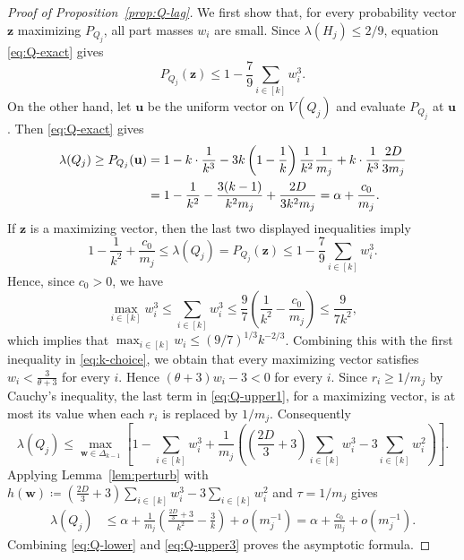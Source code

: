 \documentclass[10pt]{article}
\numberwithin{equation}{section}
\begin{document}
\begin{proof}[Proof of Proposition~\ref{prop:Q-lag}]
We first show that, for every probability vector $\mathbf{z}$ maximizing $P_{Q_j}$, all part masses $w_i$ are small. Since $\lambda(H_j)\le 2/9$, equation \eqref{eq:Q-exact} gives
\[
        P_{Q_j}(\mathbf{z})\le 1-\frac79\sum_{i\in[k]} w_i^3.
\]
On the other hand, let $\mathbf{u}$ be the uniform vector on $V(Q_j)$ and evaluate $P_{Q_j}$ at $\mathbf{u}$. 
Then \eqref{eq:Q-exact} gives
\begin{align}\label{eq:Q-lower}
    \lambda(Q_j)\ge P_{Q_j}(\mathbf{u})
        &=
        1-k\cdot\frac1{k^3}
        -3k\left(1-\frac1k\right)\frac1{k^2}\frac1{m_j}
        +k\cdot\frac1{k^3}\frac{2D}{3m_j} \notag \\
        &=1-\frac1{k^2}-\frac{3(k-1)}{k^2m_j}
        +\frac{2D}{3k^2m_j} 
        =\alpha+\frac{c_0}{m_j}.
\end{align}
If $\mathbf{z}$ is a maximizing vector, then the last two displayed inequalities imply
\[
        1-\frac1{k^2}+\frac{c_0}{m_j}
        \le \lambda(Q_j)=P_{Q_j}(\mathbf{z})
        \le 1-\frac79\sum_{i\in[k]} w_i^3 .
\]
Hence, since $c_0>0$, we have 
\[
        \max_{i\in[k]} w_i^3
        \le\sum_{i\in[k]} w_i^3
        \le \frac97\left(\frac1{k^2}-\frac{c_0}{m_j}\right)
        \le \frac{9}{7k^2}, 
\]
which implies that $\max_{i\in[k]} w_i \le \left(9/7\right)^{1/3}k^{-2/3}$. 
Combining this with the first inequality in \eqref{eq:k-choice}, we obtain that every maximizing vector satisfies $w_i<\frac3{\theta+3}$ for every $i$. Hence $(\theta+3)w_i-3<0$ for every $i$. Since $r_i\ge 1/m_j$ by Cauchy's inequality, the last term in \eqref{eq:Q-upper1}, for a maximizing vector, is at most its value when each $r_i$ is replaced by $1/m_j$. Consequently
\begin{equation}
        \lambda(Q_j)\le \max_{\mathbf{w} \in \Delta_{k-1}} \left[ 1-\sum_{i\in[k]} w_i^3 +\frac1{m_j} \left( \left(\frac{2D}{3}+3\right)\sum_{i\in[k]} w_i^3-3\sum_{i\in[k]} w_i^2 \right) \right].
        \label{eq:Q-upper2}
\end{equation}
Applying Lemma~\ref{lem:perturb} with $h(\mathbf{w}) \coloneqq \left(\frac{2D}{3}+3\right)\sum_{i\in[k]} w_i^3-3\sum_{i\in[k]} w_i^2$ and $\tau = 1/m_j$ gives
\begin{align}
        \lambda(Q_j)
        &\le
        \alpha
        +\frac1{m_j}
        \left(
        \frac{\frac{2D}{3}+3}{k^2}-\frac3k
        \right)
        +o(m_j^{-1})   
        =\alpha
        +\frac{c_0}{m_j}
        +o(m_j^{-1}).
        \label{eq:Q-upper3}
\end{align}
Combining  \eqref{eq:Q-lower} and \eqref{eq:Q-upper3} proves the asymptotic formula.
\end{proof}
\end{document}
